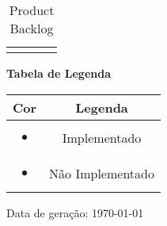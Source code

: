 \begin{landscape}
\begin{longtable}{|p{0.5in}|p{6in}|c|c|}
		\hline
		\caption{Product Backlog}
		\end{longtable}
		
		\textbf{Tabela de Legenda} \\
		\begin{tabular}{|c|c|}
		\hline 
		{\bf Cor} & {\bf Legenda} \\
		\hline \textcolor{cImplementado}{\begin{huge} $\bullet$ \end{huge}} & Implementado \\
		\hline \textcolor{cNaoImplementado}{\begin{huge} $\bullet$ \end{huge}} & Não Implementado \\
		\hline
		\end{tabular}

		Data de geração: \today
		

\end{landscape}
